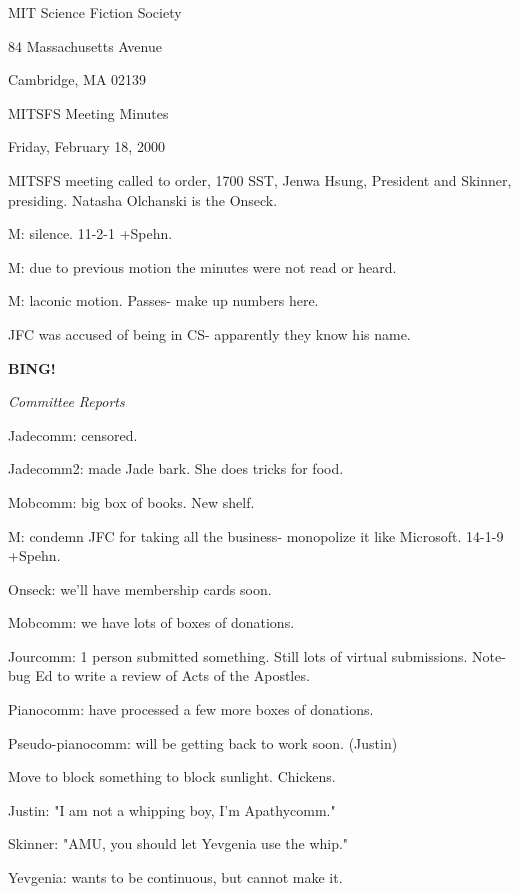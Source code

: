 \documentclass[12pt]{article}
\newcommand{\bing}{{\bf BING!} }
\newcommand{\goto}[1]{\bing \vskip 12pt \centerline{{\em{#1}}}}
\begin{document}
\begin{center}

MIT Science Fiction Society 

84 Massachusetts Avenue

Cambridge, MA 02139

\vspace{12pt}

MITSFS Meeting Minutes 

Friday, February 18, 2000

\end{center}
 
\vspace{18pt}

\setlength{\parskip}{6pt}

\noindent
MITSFS meeting called to order, 1700 SST, Jenwa Hsung, President and
Skinner, presiding.  Natasha Olchanski is the Onseck.

M: silence. 11-2-1 +Spehn.

M: due to previous motion the minutes were not read or heard.

M: laconic motion. Passes- make up numbers here.

JFC was accused of being in CS- apparently they know his name.

\goto{Committee Reports}

Jadecomm: censored.

Jadecomm2: made Jade bark. She does tricks for food.

Mobcomm: big box of books. New shelf.

M: condemn JFC for taking all the business- monopolize it like Microsoft. 14-1-9 +Spehn.

Onseck: we'll have membership cards soon.

Mobcomm: we have lots of boxes of donations.

Jourcomm: 1 person submitted something. Still lots of virtual submissions. Note- bug Ed to write a review of Acts of the Apostles.

Pianocomm: have processed a few more boxes of donations.

Pseudo-pianocomm: will be getting back to work soon. (Justin)

Move to block something to block sunlight. Chickens.

Justin: "I am not a whipping boy, I'm Apathycomm."

Skinner: "AMU, you should let Yevgenia use the whip."

Yevgenia: wants to be continuous, but cannot make it.
\end{document}
